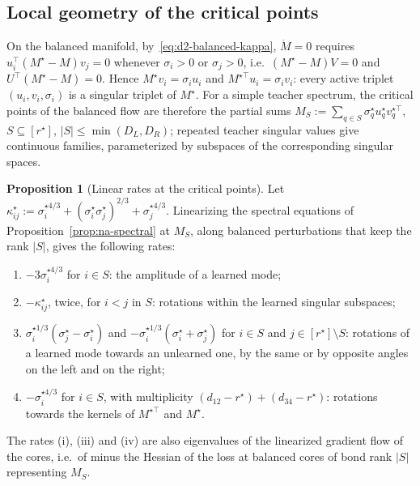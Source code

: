 \documentclass[11pt]{article}
\theoremstyle{definition}
\newtheorem{proposition}[theorem]{Proposition}
\numberwithin{equation}{section}
\begin{document}
\subsection{Local geometry of the critical points}\label{sec:na-saddles}

On the balanced manifold, by~\eqref{eq:d2-balanced-kappa}, $\dot M=0$ requires $u_i^\top(M^\star-M)v_j=0$ whenever $\sigma_i>0$ or $\sigma_j>0$, i.e.\ $(M^\star-M)V=0$ and $U^\top(M^\star-M)=0$. Hence $M^\star v_i=\sigma_iu_i$ and $M^{\star\top}u_i=\sigma_iv_i$: every active triplet $(u_i,v_i,\sigma_i)$ is a singular triplet of $M^\star$. For a simple teacher spectrum, the critical points of the balanced flow are therefore the partial sums $M_S:=\sum_{q\in S}\sigma^\star_qu^\star_qv^{\star\top}_q$, $S\subseteq[r^\star]$, $|S|\le\min(D_L,D_R)$; repeated teacher singular values give continuous families, parameterized by subspaces of the corresponding singular spaces.

\begin{proposition}[Linear rates at the critical points]\label{prop:na-saddles}
Let $\kappa^\star_{ij}:=\sigma^{\star4/3}_i+(\sigma^\star_i\sigma^\star_j)^{2/3}+\sigma^{\star4/3}_j$. Linearizing the spectral equations of Proposition~\ref{prop:na-spectral} at $M_S$, along balanced perturbations that keep the rank $|S|$, gives the following rates:
\begin{enumerate}[label=(\roman*),nosep]
\item $-3\sigma^{\star4/3}_i$ for $i\in S$: the amplitude of a learned mode;
\item $-\kappa^\star_{ij}$, twice, for $i<j$ in $S$: rotations within the learned singular subspaces;
\item $\sigma^{\star1/3}_i(\sigma^\star_j-\sigma^\star_i)$ and $-\sigma^{\star1/3}_i(\sigma^\star_i+\sigma^\star_j)$ for $i\in S$ and $j\in[r^\star]\setminus S$: rotations of a learned mode towards an unlearned one, by the same or by opposite angles on the left and on the right;
\item $-\sigma^{\star4/3}_i$ for $i\in S$, with multiplicity $(d_{12}-r^\star)+(d_{34}-r^\star)$: rotations towards the kernels of $M^{\star\top}$ and $M^\star$.
\end{enumerate}
The rates (i), (iii) and (iv) are also eigenvalues of the linearized gradient flow of the cores, i.e.\ of minus the Hessian of the loss at balanced cores of bond rank $|S|$ representing $M_S$.
\end{proposition}
\end{document}
